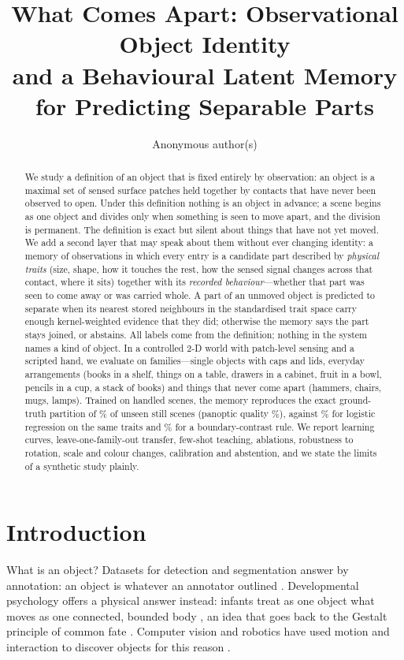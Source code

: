 \documentclass[10pt]{article}
\title{What Comes Apart: Observational Object Identity\\ and a Behavioural Latent Memory for Predicting Separable Parts}
\author{Anonymous author(s)}
\date{}
\begin{document}
\maketitle

\begin{abstract}
We study a definition of an object that is fixed entirely by observation: an object is a maximal set of sensed surface patches held together by contacts that have never been observed to open. Under this definition nothing is an object in advance; a scene begins as one object and divides only when something is seen to move apart, and the division is permanent. The definition is exact but silent about things that have not yet moved. We add a second layer that may speak about them without ever changing identity: a memory of observations in which every entry is a candidate part described by \emph{physical traits} (size, shape, how it touches the rest, how the sensed signal changes across that contact, where it sits) together with its \emph{recorded behaviour}---whether that part was seen to come away or was carried whole. A part of an unmoved object is predicted to separate when its nearest stored neighbours in the standardised trait space carry enough kernel-weighted evidence that they did; otherwise the memory says the part stays joined, or abstains. All labels come from the definition; nothing in the system names a kind of object. In a controlled 2-D world with patch-level sensing and a scripted hand, we evaluate on \nFamilies{} families---single objects with caps and lids, everyday arrangements (books in a shelf, things on a table, drawers in a cabinet, fruit in a bowl, pencils in a cup, a stack of books) and things that never come apart (hammers, chairs, mugs, lamps). Trained on \nTrainScenes{} handled scenes, the memory reproduces the exact ground-truth partition of \accAll\% of unseen still scenes (panoptic quality \pqAll\%), against \accLogistic\% for logistic regression on the same traits and \accEdge\% for a boundary-contrast rule. We report learning curves, leave-one-family-out transfer, few-shot teaching, ablations, robustness to rotation, scale and colour changes, calibration and abstention, and we state the limits of a synthetic study plainly.
\end{abstract}

\section{Introduction}

What is an object? Datasets for detection and segmentation answer by annotation: an object is whatever an annotator outlined \citep{lin2014coco,kirillov2023sam}. Developmental psychology offers a physical answer instead: infants treat as one object what moves as one connected, bounded body \citep{spelke1990principles}, an idea that goes back to the Gestalt principle of common fate \citep{wertheimer1923}. Computer vision and robotics have used motion and interaction to discover objects for this reason \citep{metta2003better,katz2008manipulating,vanhoof2014probabilistic,bohg2017interactive,pathak2017watching,pathak2018interaction,yang2021motiongroup,bao2022discovering}.
\end{document}
